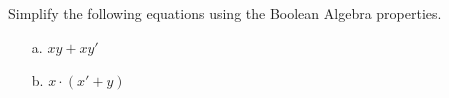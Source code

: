 \documentclass[a4paper,12pt]{book}
\newcounter{question}
\begin{document}
        \begin{questionNOGRADE}{\thequestion}

            Simplify the following equations using the Boolean Algebra properties.

            \begin{enumerate}
                \item[a.]   $xy + xy'$

                \item[b.]   $x \cdot (x' + y)$

            \end{enumerate}
        \end{questionNOGRADE}

        \newpage
\end{document}

